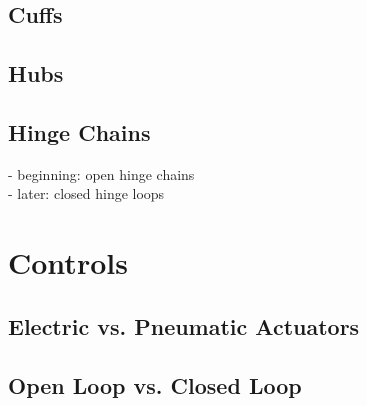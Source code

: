 \subsection{Cuffs}
\subsection{Hubs}
\subsection{Hinge Chains}
- beginning: open hinge chains\\
- later: closed hinge loops
\section{Controls}
\subsection{Electric vs. Pneumatic Actuators}
\subsection{Open Loop vs. Closed Loop}
